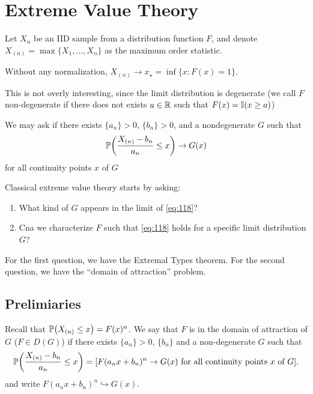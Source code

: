 
\chapter{Extreme Value Theory}
\label{cha:extreme-value-theory}

Let $X_{n}$ be an IID sample from a distribution function $F$, and
denote $X_{(n)} = \max \{ X_{1}, \dots, X_{n} \}$ as the maximum order
statistic.

Without any normalization, $X_{(n)} \rightarrow x_{\star} = \inf \{ x:
F(x) = 1 \}$.

This is not overly interesting, since the limit distribution is
degenerate (we call $F$ non-degenerate if there does not exists $a \in
\mathbb{R}$ such that $F(x) = \I{x \geq a}$)

We may ask if there exists $\{ a_{n} \} > 0$, $\{ b_{n} \} > 0$, and a
nondegenerate $G$ such that
\begin{equation}
  \label{eq:118}
  \Prob{\frac{X_{(n)} - b_{n}}{a_{n}} \leq x} \rightarrow G(x)  
\end{equation} for all continuity points $x$ of $G$

Classical extreme value theory starts by asking:
\begin{enumerate}
\item What kind of $G$ appears in the limit of \eqref{eq:118}?
\item Cna we characterize $F$ such that \eqref{eq:118} holds for a
  specific limit distribution $G$?
\end{enumerate}

For the first question, we have the Extremal Types theorem. For the
second question, we have the ``domain of attraction'' problem.


\section{Prelimiaries}
\label{sec:prelimiaries}

Recall that $\Prob{X_{(n)} \leq x} = F(x)^{n}$.  We say that $F$ is in
the domain of attraction of $G$ ($F \in D(G)$) if there exists $\{ a_{n} \} > 0$, $\{
b_{n} \} $ and a non-degenerate $G$ such that
\begin{equation}
  \label{eq:119}
  \Prob{\frac{X_{(n)} - b_{n}}{a_{n}} \leq x} = [\text{$F(a_{n} x +
    b_{n})^{n} \rightarrow G(x)$ for all continuity points $x$ of $G$}].
\end{equation} and write $F(a_{n} x + b_{n})^{n} \hookrightarrow G(x)$.

